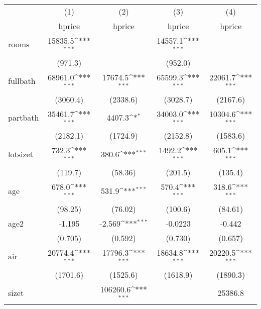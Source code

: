 {
\def\sym#1{\ifmmode^{#1}\else\(^{#1}\)\fi}
\begin{tabular}{l*{4}{c}}
\hline\hline
            &\multicolumn{1}{c}{(1)}&\multicolumn{1}{c}{(2)}&\multicolumn{1}{c}{(3)}&\multicolumn{1}{c}{(4)}\\
            &\multicolumn{1}{c}{hprice}&\multicolumn{1}{c}{hprice}&\multicolumn{1}{c}{hprice}&\multicolumn{1}{c}{hprice}\\
\hline
rooms       &     15835.5\sym{***}&                     &     14557.1\sym{***}&                     \\
            &     (971.3)         &                     &     (952.0)         &                     \\
[1em]
fullbath    &     68961.0\sym{***}&     17674.5\sym{***}&     65599.3\sym{***}&     22061.7\sym{***}\\
            &    (3060.4)         &    (2338.6)         &    (3028.7)         &    (2167.6)         \\
[1em]
partbath    &     35461.7\sym{***}&      4407.3\sym{*}  &     34003.0\sym{***}&     10304.6\sym{***}\\
            &    (2182.1)         &    (1724.9)         &    (2152.8)         &    (1583.6)         \\
[1em]
lotsizet    &       732.3\sym{***}&       380.6\sym{***}&      1492.2\sym{***}&       605.1\sym{***}\\
            &     (119.7)         &     (58.36)         &     (201.5)         &     (135.4)         \\
[1em]
age         &       678.0\sym{***}&       531.9\sym{***}&       570.4\sym{***}&       318.6\sym{***}\\
            &     (98.25)         &     (76.02)         &     (100.6)         &     (84.61)         \\
[1em]
age2        &      -1.195         &      -2.569\sym{***}&     -0.0223         &      -0.442         \\
            &     (0.705)         &     (0.592)         &     (0.730)         &     (0.657)         \\
[1em]
air         &     20774.4\sym{***}&     17796.3\sym{***}&     18634.8\sym{***}&     20220.5\sym{***}\\
            &    (1701.6)         &    (1525.6)         &    (1618.9)         &    (1890.3)         \\
[1em]
sizet       &                     &    106260.6\sym{***}&                     &     25386.8         \\

\end{tabular}}
